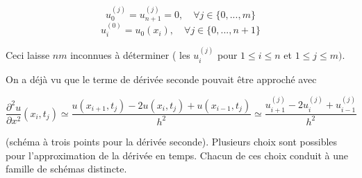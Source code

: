 \documentclass{beamer}
\begin{document}
  \begin{frame}   
\begin{equation}
u_0^{(j)} =u_{n+1}^{(j)} =0,\quad \forall j\in\{0,...,m\} 
\end{equation}
\begin{equation}
u_i^{(0)} =u_{0}(x_i),\quad \forall j\in\{0,...,n+1\} 
\end{equation}

Ceci laisse $n m$  inconnues à déterminer ( les $u_i^{(j)}$ pour $1 \leqslant i \leqslant n$ et $1 \leqslant j \leqslant m)$. 

 On a déjà vu que le terme de dérivée seconde pouvait être approché avec


\[\frac{\partial^2 u}{\partial x^2}(x_i,t_j) \simeq \frac{u(x_{i+1},t_j)-2u(x_{i},t_j)+u(x_{i-1},t_j)}{h^2}\simeq
\frac{u_{i+1}^{(j)}-2u_{i}^{(j)}+u_{i-1}^{(j)}}{h^2}\]

   (schéma à trois points pour la dérivée seconde). Plusieurs choix sont possibles pour l'approximation de la dérivée en temps. Chacun de ces choix conduit à une famille de schémas distincte.
 \end{frame}
  
 
\end{document}
